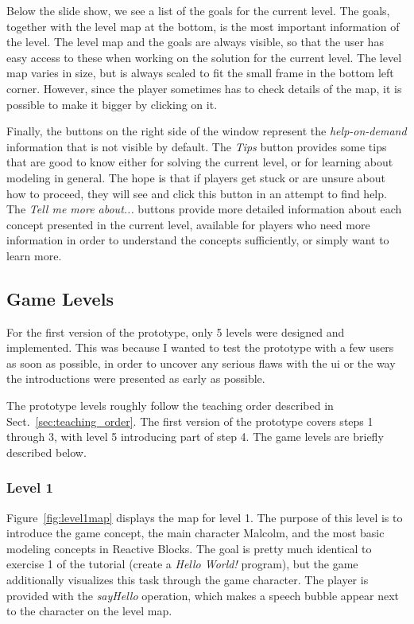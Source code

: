 \noindent
Below the slide show, we see a list of the goals for the current level. The goals, together with the level map at the bottom, is the most important information of the level. The level map and the goals are always visible, so that the user has easy access to these when working on the solution for the current level. The level map varies in size, but is always scaled to fit the small frame in the bottom left corner. However, since the player sometimes has to check details of the map, it is possible to make it bigger by clicking on it.

\noindent
Finally, the buttons on the right side of the window represent the \emph{help-on-demand} information that is not visible by default. The \emph{Tips} button provides some tips that are good to know either for solving the current level, or for learning about modeling in general. The hope is that if players get stuck or are unsure about how to proceed, they will see and click this button in an attempt to find help. The \emph{Tell me more about...} buttons provide more detailed information about each concept presented in the current level, available for players who need more information in order to understand the concepts sufficiently, or simply want to learn more.

\subsection{Game Levels}
\label{sec:game_levels}
For the first version of the prototype, only 5 levels were designed and implemented. This was because I wanted to test the prototype with a few users as soon as possible, in order to uncover any serious flaws with the \gls{ui} or the way the introductions were presented as early as possible. 

\noindent
The prototype levels roughly follow the teaching order described in Sect.~\ref{sec:teaching_order}. The first version of the prototype covers steps 1 through 3, with level 5 introducing part of step 4. The game levels are briefly described below.

\subsubsection{Level 1}
Figure~\ref{fig:level1map} displays the map for level 1. The purpose of this level is to introduce the game concept, the main character Malcolm, and the most basic modeling concepts in Reactive Blocks. The goal is pretty much identical to exercise 1 of the tutorial (create a \emph{Hello World!} program), but the game additionally visualizes this task through the game character. The player is provided with the \emph{sayHello} operation, which makes a speech bubble appear next to the character on the level map.

